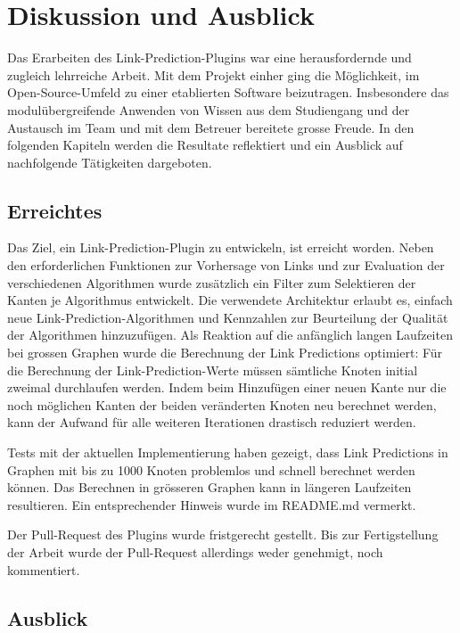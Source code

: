 \chapter{Diskussion und Ausblick}

Das Erarbeiten des Link-Prediction-Plugins war eine herausfordernde und zugleich lehrreiche Arbeit.
Mit dem Projekt einher ging die Möglichkeit, im Open-Source-Umfeld zu einer etablierten Software beizutragen.
Insbesondere das modulübergreifende Anwenden von Wissen aus dem Studiengang und der Austausch im Team und mit dem Betreuer bereitete grosse Freude.
In den folgenden Kapiteln werden die Resultate reflektiert und ein Ausblick auf nachfolgende Tätigkeiten dargeboten.

\section{Erreichtes}

Das Ziel, ein Link-Prediction-Plugin zu entwickeln, ist erreicht worden.
Neben den erforderlichen Funktionen zur Vorhersage von Links und zur Evaluation der verschiedenen Algorithmen wurde zusätzlich ein Filter zum Selektieren der Kanten je Algorithmus entwickelt.
Die verwendete Architektur erlaubt es, einfach neue Link-Prediction-Algorithmen und Kennzahlen zur Beurteilung der Qualität der Algorithmen hinzuzufügen.
Als Reaktion auf die anfänglich langen Laufzeiten bei grossen Graphen wurde die Berechnung der Link Predictions optimiert:
Für die Berechnung der Link-Prediction-Werte müssen sämtliche Knoten initial zweimal durchlaufen werden.
Indem beim Hinzufügen einer neuen Kante nur die noch möglichen Kanten der beiden veränderten Knoten neu berechnet werden, kann der Aufwand für alle weiteren Iterationen drastisch reduziert werden.

Tests mit der aktuellen Implementierung haben gezeigt, dass Link Predictions in Graphen mit bis zu 1000 Knoten problemlos und schnell berechnet werden können.
Das Berechnen in grösseren Graphen kann in längeren Laufzeiten resultieren.
Ein entsprechender Hinweis wurde im README.md vermerkt.

Der Pull-Request des Plugins wurde fristgerecht gestellt.
Bis zur Fertigstellung der Arbeit wurde der Pull-Request allerdings weder genehmigt, noch kommentiert.

\section{Ausblick}

